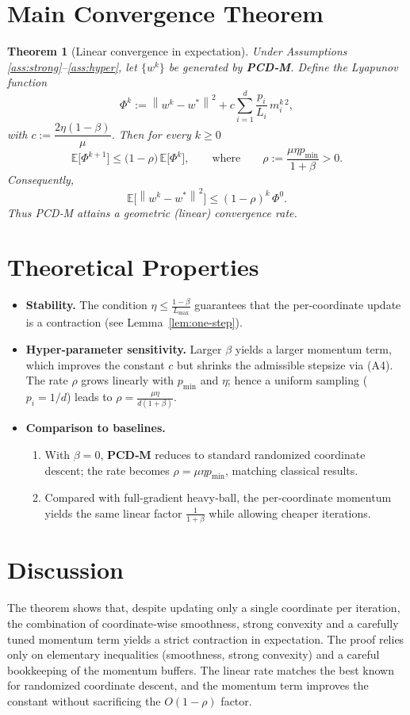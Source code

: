 \documentclass{article}
\newtheorem{theorem}{Theorem}
\newcommand{\E}{\mathbb{E}}
\newcommand{\norm}[1]{\left\lVert#1\right\rVert}
\begin{document}
\section*{Main Convergence Theorem}
\begin{theorem}[Linear convergence in expectation]\label{thm:linear}
Under Assumptions \ref{ass:strong}–\ref{ass:hyper}, let $\{w^{k}\}$ be generated by \textbf{PCD‑M}. Define the Lyapunov function
\[
\Phi^{k}:=\norm{w^{k}-w^{*}}^{2}+c\sum_{i=1}^{d}\frac{p_i}{L_i}\,m_{i}^{k\,2},
\]
with $c:=\dfrac{2\eta(1-\beta)}{\mu}$. Then for every $k\ge0$
\[
\E\!\bigl[\Phi^{k+1}\bigr]\le\bigl(1-\rho\bigr)\,\E\!\bigl[\Phi^{k}\bigr],
\qquad\text{where}\qquad 
\rho:=\frac{\mu\eta p_{\min}}{1+\beta}>0 .
\tag{1}
\]
Consequently,
\[
\E\!\bigl[\norm{w^{k}-w^{*}}^{2}\bigr]\le (1-\rho)^{k}\,\Phi^{0}.
\tag{2}
\]
Thus PCD‑M attains a geometric (linear) convergence rate.
\end{theorem}

\section*{Theoretical Properties}
\begin{itemize}[leftmargin=*]
\item \textbf{Stability.} The condition $\eta\le\frac{1-\beta}{L_{\max}}$ guarantees that the per‑coordinate update is a contraction (see Lemma~\ref{lem:one-step}).
\item \textbf{Hyper‑parameter sensitivity.} Larger $\beta$ yields a larger momentum term, which improves the constant $c$ but shrinks the admissible stepsize via (A4). The rate $\rho$ grows linearly with $p_{\min}$ and $\eta$; hence a uniform sampling ($p_i=1/d$) leads to $\rho =\frac{\mu\eta}{d(1+\beta)}$.
\item \textbf{Comparison to baselines.}
    \begin{enumerate}
        \item With $\beta=0$, \textbf{PCD‑M} reduces to standard randomized coordinate descent; the rate becomes $\rho=\mu\eta p_{\min}$, matching classical results.
        \item Compared with full‑gradient heavy‑ball, the per‑coordinate momentum yields the same linear factor $\frac{1}{1+\beta}$ while allowing cheaper iterations.
    \end{enumerate}
\end{itemize}

\section*{Discussion}
The theorem shows that, despite updating only a single coordinate per iteration, the combination of coordinate‑wise smoothness, strong convexity and a carefully tuned momentum term yields a strict contraction in expectation. The proof relies only on elementary inequalities (smoothness, strong convexity) and a careful bookkeeping of the momentum buffers. The linear rate matches the best known for randomized coordinate descent, and the momentum term improves the constant without sacrificing the $O(1-\rho)$ factor.
\end{document}
